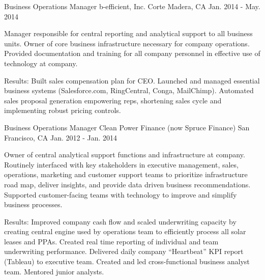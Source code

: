 \begin{cventries}
\cventry
{Business Operations Manager} %
{b-efficient, Inc.} %
{Corte Madera, CA} %
{Jan. 2014 - May. 2014} %
{ %
\begin{cvitems}
\item {Manager responsible for central reporting and analytical support to all business units. Owner of core business infrastructure necessary for company operations. Provided documentation and training for all company personnel in effective use of technology at company.}
\end{cvitems}
}
\begin{cvitemsnb}
\item {Results: Built sales compensation plan for CEO. Launched and managed essential business systems (Salesforce.com, RingCentral, Conga, MailChimp). Automated sales proposal generation empowering reps, shortening sales cycle and implementing robust pricing controls.}
\end{cvitemsnb}


\cventry
{Business Operations Manager} %
{Clean Power Finance (now Spruce Finance)} %
{San Francisco, CA} %
{Jan. 2012 - Jan. 2014} %
{ %
\begin{cvitems}
\item {Owner of central analytical support functions and infrastructure at company. Routinely interfaced with key stakeholders in executive management, sales, operations, marketing and customer support teams to prioritize infrastructure road map, deliver insights, and provide data driven business recommendations. Supported customer-facing teams with technology to improve and simplify business processes.}
\end{cvitems}
}
\begin{cvitemsnb}
\item {Results: Improved company cash flow and scaled underwriting capacity by creating central engine used by operations team to efficiently process all solar leases and PPAs. Created real time reporting of individual and team underwriting performance. Delivered daily company ``Heartbeat'' KPI report (Tableau) to executive team. Created and led cross-functional business analyst team. Mentored junior analysts.}
\end{cvitemsnb}


\end{cventries}

